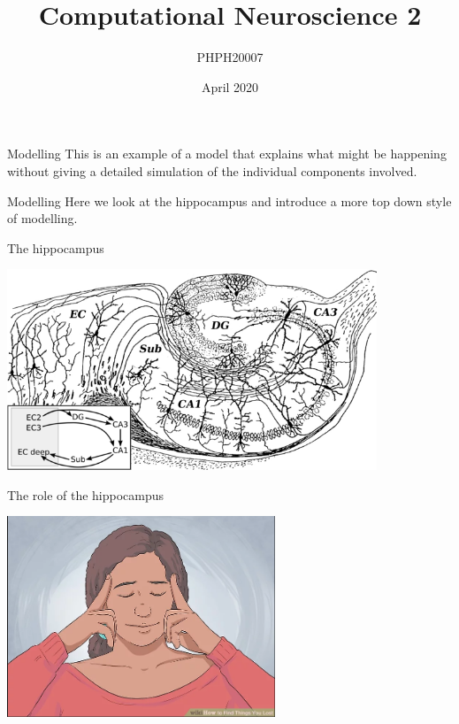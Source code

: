 \documentclass{beamer}
\title[Computational Neuroscience 2]{Computational Neuroscience 2}
\author{PHPH20007}
\institute{\texttt{github.com/conorhoughton/PHPH20007}}
\date{April 2020}
\begin{document}
\maketitle

\begin{frame}{Modelling}
This is an example of a model that explains what might be happening without giving a detailed simulation of the individual components involved.
  \end{frame}

\begin{frame}{Modelling}
  Here we look at the hippocampus and introduce a more top down style
  of modelling.
\end{frame}
  
\begin{frame}{The hippocampus}
  \begin{center}
    \includegraphics[height=6cm]{hippocampus.png}
  \end{center}
      \vfill
\end{frame}

\begin{frame}{The role of the hippocampus}
  \begin{center}
    \includegraphics[height=6cm]{finding_lost_items.png}
  \end{center}
      \vfill
\end{frame}
\end{document}
